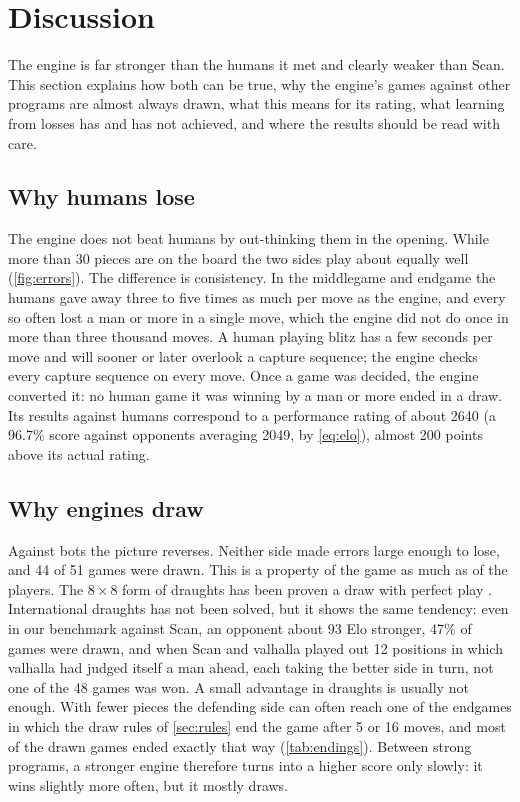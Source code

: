 \section{Discussion}\label{sec:disc}

The engine is far stronger than the humans it met and clearly weaker than Scan.
This section explains how both can be true, why the engine's games against other
programs are almost always drawn, what this means for its rating, what learning
from losses has and has not achieved, and where the results should be read with
care.

\subsection{Why humans lose}\label{sec:disc-humans}

The engine does not beat humans by out-thinking them in the opening. While more
than 30 pieces are on the board the two sides play about equally well
(\cref{fig:errors}). The difference is consistency. In the middlegame and
endgame the humans gave away three to five times as much per move as the engine,
and every so often lost a man or more in a single move, which the engine did not
do once in more than three thousand moves. A human playing blitz has a few
seconds per move and will sooner or later overlook a capture sequence; the
engine checks every capture sequence on every move. Once a game was decided, the
engine converted it: no human game it was winning by a man or more ended in a
draw. Its results against humans correspond to a performance rating of about
2640 (a 96.7\% score against opponents averaging 2049, by \cref{eq:elo}), almost
200 points above its actual rating.

\subsection{Why engines draw}\label{sec:disc-draws}

Against bots the picture reverses. Neither side made errors large enough to
lose, and 44 of 51 games were drawn. This is a property of the game as much as of
the players. The $8\times8$ form of draughts has been proven a draw with perfect
play \parencite{schaeffer2007}. International draughts has not been solved, but
it shows the same tendency: even in our benchmark against Scan, an opponent about
93 Elo stronger, 47\% of games were drawn, and when Scan and valhalla played out
12 positions in which valhalla had judged itself a man ahead, each taking the
better side in turn, not one of the 48 games was won. A small advantage in draughts is usually not
enough. With fewer pieces the defending side can often reach one of the endgames
in which the draw rules of \cref{sec:rules} end the game after 5 or 16 moves, and
most of the drawn games ended exactly that way (\cref{tab:endings}). Between
strong programs, a stronger engine therefore turns into a higher score only
slowly: it wins slightly more often, but it mostly draws.

